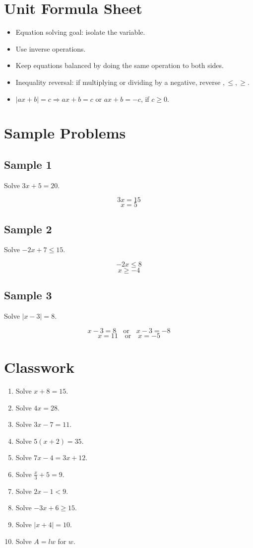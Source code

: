 \documentclass[11pt]{book}
\begin{document}
\section{Unit Formula Sheet}

\begin{itemize}
\item Equation solving goal: isolate the variable.
\item Use inverse operations.
\item Keep equations balanced by doing the same operation to both sides.
\item Inequality reversal: if multiplying or dividing by a negative, reverse \(<,>,\le,\ge\).
\item \(|ax+b|=c\Rightarrow ax+b=c\) or \(ax+b=-c\), if \(c\ge0\).
\end{itemize}

\section{Sample Problems}

\subsection{Sample 1}

Solve \(3x+5=20\).

\[3x=15\]
\[x=5\]

\subsection{Sample 2}

Solve \(-2x+7\le15\).

\[-2x\le8\]
\[x\ge-4\]

\subsection{Sample 3}

Solve \(|x-3|=8\).

\[x-3=8 \quad \text{or} \quad x-3=-8\]
\[x=11 \quad \text{or} \quad x=-5\]

\section{Classwork}

\begin{enumerate}
\item Solve \(x+8=15\).
\item Solve \(4x=28\).
\item Solve \(3x-7=11\).
\item Solve \(5(x+2)=35\).
\item Solve \(7x-4=3x+12\).
\item Solve \(\frac{x}{3}+5=9\).
\item Solve \(2x-1<9\).
\item Solve \(-3x+6\ge15\).
\item Solve \(|x+4|=10\).
\item Solve \(A=lw\) for \(w\).
\end{enumerate}
\end{document}
